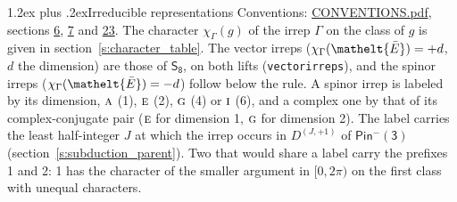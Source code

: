 \documentclass[10pt,a4paper]{article}
\makeatletter
\renewcommand\section{\@startsection{section}{1}{\z@}{-3ex plus -1ex minus -.2ex}%
  {1.2ex plus .2ex}{\normalfont\large\sffamily\bfseries\color{parttitle}}}
\numberwithin{equation}{section}
\newcommand{\eltfont}[1]{{\let\sigma\eltsigma\mathelt{#1}}}
\newcommand{\grp}[1]{\mathsf{#1}}
\newcommand{\irr}[1]{\text{\normalfont\scshape #1}}
\newcommand{\elt}[1]{\eltfont{#1}}
\newcommand{\irrJp}[2]{D^{(#1,#2)}}
\newcommand{\irchar}[1]{\chi_{#1}}
\newcommand{\barred}[1]{\bar{#1}}
\makeatother
\begin{document}
\section{Irreducible representations}\label{s:irreps}
Conventions: \href{../../CONVENTIONS.pdf}{CONVENTIONS.pdf}, sections \href{../../../rotation/CONVENTIONS.pdf\#conv.6}{6}, \href{../../../rotation/CONVENTIONS.pdf\#conv.7}{7} and \href{../../CONVENTIONS.pdf\#conv.23}{23}.
\leavevmode\label{n:function.character}\label{n:irrep.Gamma}The character $\irchar{\Gamma}(g)$ of the irrep $\Gamma$ on the class of $g$ is given in section~\ref{s:character_table}. \label{n:index.dimension}The vector irreps ($\irchar{\Gamma}(\elt{\barred{E}}) = +d$, $d$ the dimension) are those of \href{../../../rotation/data/pdf/S8.pdf}{$\grp{S_{8}}$}, on both lifts (\texttt{vectorirreps}), and the spinor irreps ($\irchar{\Gamma}(\elt{\barred{E}}) = -d$) follow below the rule. A spinor irrep is labeled by its dimension, $\irr{a}$ (1), $\irr{e}$ (2), $\irr{g}$ (4) or $\irr{i}$ (6), and a complex one by that of its complex-conjugate pair ($\irr{e}$ for dimension 1, $\irr{g}$ for dimension 2). The label carries the least half-integer $J$ at which the irrep occurs in $\irrJp{J}{+1}$ of $\grp{Pin^{-}(3)}$ (section~\ref{s:subduction_parent}). Two that would share a label carry the prefixes 1 and 2: 1 has the character of the smaller argument in $[0, 2\pi)$ on the first class with unequal characters.
\end{document}
